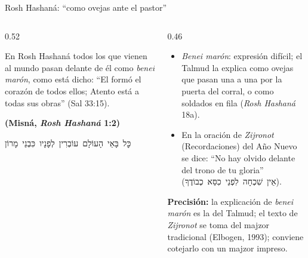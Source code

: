 \documentclass[hyperref={bookmarks=false},aspectratio=169]{beamer}
\newcommand{\heb}[1]{\mbox{\foreignlanguage{hebrew}{#1}}}
\newcommand{\fuente}[1]{\par\hfill{\upshape\bfseries\footnotesize\textcolor{azul}{#1}}}
\newcommand{\precision}[1]{{\footnotesize\color{gris}\textbf{Precisión:} #1}}
\begin{document}
\begin{frame}{Rosh Hashaná: ``como ovejas ante el pastor''}
\begin{columns}[t,onlytextwidth]
\begin{column}{0.52\textwidth}
\begin{cita}En Rosh Hashaná todos los que vienen al mundo pasan delante de él como \emph{benei marón}, como está dicho: ``El formó el corazón de todos ellos; Atento está a todas sus obras'' (Sal 33:15).\fuente{(Misná, \emph{Rosh Hashaná} 1:2)}\end{cita}
\begin{center}\heb{כׇּל בָּאֵי הָעוֹלָם עוֹבְרִין לְפָנָיו כִּבְנֵי מָרוֹן}\end{center}
\end{column}
\begin{column}{0.46\textwidth}\small
\begin{itemize}
\item \emph{Benei marón}: expresión difícil; el Talmud la explica como ovejas que pasan una a una por la puerta del corral, o como soldados en fila (\emph{Rosh Hashaná} 18a).
\item En la oración de \emph{Zijronot} (Recordaciones) del Año Nuevo se dice: ``No hay olvido delante del trono de tu gloria'' (\heb{אֵין שִׁכְחָה לִפְנֵי כִסֵּא כְבוֹדֶךָ}).
\end{itemize}
\precision{la explicación de \emph{benei marón} es la del Talmud; el texto de \emph{Zijronot} se toma del majzor tradicional (Elbogen, 1993); conviene cotejarlo con un majzor impreso.}
\end{column}
\end{columns}
\end{frame}
\end{document}
